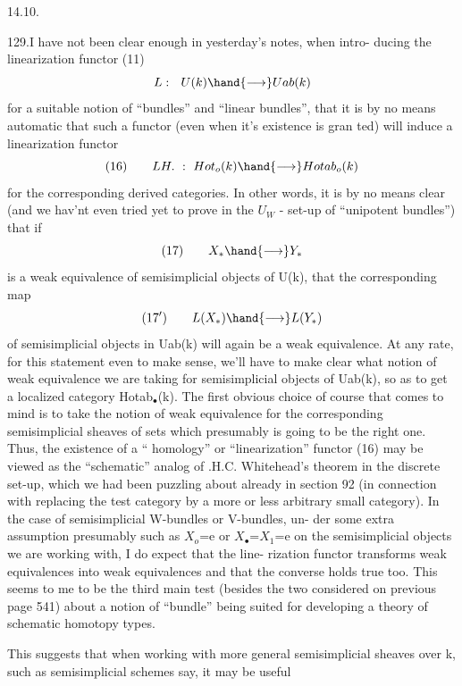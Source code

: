 
14.10.

129.\quad I have not been clear enough in yesterday's notes, when intro-%
ducing the linearization functor (11)
\[ L:\ \ U(k)\hand{\longrightarrow} Uab(k) \]
for a suitable notion of ``bundles'' and ``linear bundles'', that it is by
no means automatic that such a functor (even when it's existence is gran%
ted) will induce a linearization functor
\[ (16)\qquad LH.\ :\ Hot_{o}(k)\hand{\longrightarrow} Hotab_{o}(k) \]
for the corresponding derived categories. In other words, it is by no
means clear (and we hav'nt even tried yet to prove in the $U_{W}$ - set-up
of ``unipotent bundles'') that if
\[ (17)\qquad X_{*}\hand{\longrightarrow} Y_{*} \]
is a weak equivalence of semisimplicial objects of U(k), that the
corresponding map
\[ (17')\qquad L(X_{*})\hand{\longrightarrow} L(Y_{*}) \]
of semisimplicial objects in Uab(k) will again be a weak equivalence.
At any rate, for this statement even to make sense, we'll have to make
clear what notion of weak equivalence we are taking for  semisimplicial
objects of Uab(k), so as to get a localized category Hotab$_{\bullet}$(k). The
first obvious choice of course that comes to mind is to take the notion
of weak equivalence for the corresponding semisimplicial sheaves of sets\hand{,}
which presumably is going to be the right one. Thus, the existence of
a `` homology'' or ``linearization'' functor (16) may be viewed as the
``schematic'' analog of .H.C. Whitehead's theorem in the discrete set-up,
which we had been puzzling about already in section 92 (in connection
with replacing the test category \hand{$\Delta$} by a more or less arbitrary small
category). In the case of semisimplicial W-bundles or V-bundles, un-%
der some extra assumption presumably such as $X_{o}$=e or $X_{\bullet}$=$X_{1}$=e on the
semisimplicial objects we are working with, I do expect that the line-%
rization functor transforms  weak equivalences into
weak equivalences\hand{,} and that the converse holds true too. This seems to
me to be the third main test (besides the two considered on previous
page 541) about a notion of ``bundle'' being suited for developing a
theory of schematic homotopy types.

This suggests that when working with more general semisimplicial
sheaves over k, such as semisimplicial schemes say, it may be useful


